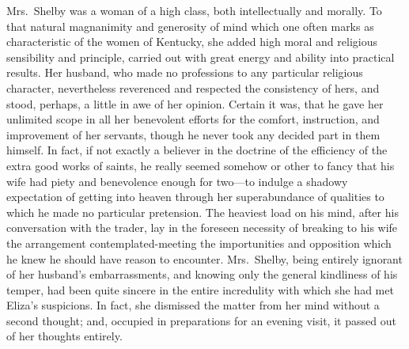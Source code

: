 Mrs.\ Shelby was a woman of a high class, both intellectually and morally. To
that natural magnanimity and generosity of mind which one often marks as
characteristic of the women of Kentucky, she added high moral and religious
sensibility and principle, carried out with great energy and ability into
practical results. Her husband, who made no professions to any particular
religious character, nevertheless reverenced and respected the consistency of
hers, and stood, perhaps, a little in awe of her opinion. Certain it was, that
he gave her unlimited scope in all her benevolent efforts for the comfort,
instruction, and improvement of her servants, though he never took any decided
part in them himself. In fact, if not exactly a believer in the doctrine of the
efficiency of the extra good works of saints, he really seemed somehow or other
to fancy that his wife had piety and benevolence enough for two---to indulge
a shadowy expectation of getting into heaven through her superabundance of
qualities to which he made no particular pretension. The heaviest load on his
mind, after his conversation with the trader, lay in the foreseen necessity of
breaking to his wife the arrangement contemplated-meeting the importunities and
opposition which he knew he should have reason to encounter. Mrs.\ Shelby, being
entirely ignorant of her husband's embarrassments, and knowing only the general
kindliness of his temper, had been quite sincere in the entire incredulity with
which she had met Eliza's suspicions. In fact, she dismissed the matter from her
mind without a second thought; and, occupied in preparations for an evening
visit, it passed out of her thoughts entirely.


